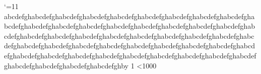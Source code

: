 \catcode`\@=11
\newcount\n \newcount\m
\def\a{}\def\b#1{}\def\c#1,#2.{}
\expandafter\def\csname w\endcsname{}
\def\h{                                                                                                   }
 \loop \h \advance\n by 1 \ifnum\n<1000 \repeat
\bye

